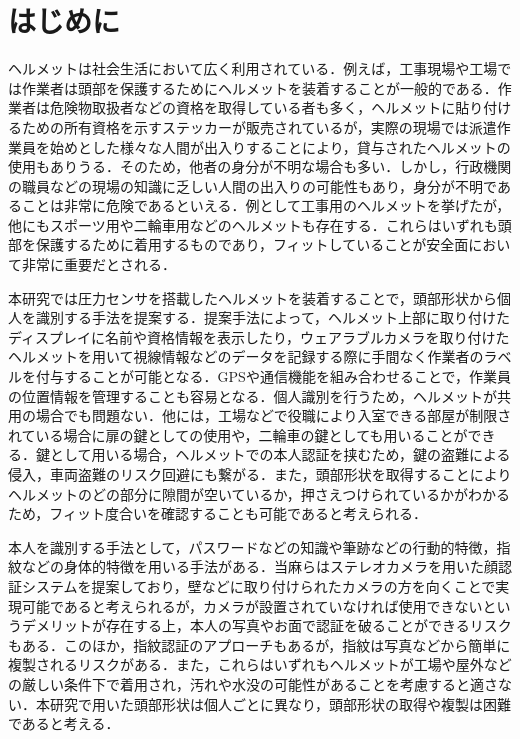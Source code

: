 \documentclass[Japanese,noauthor]{dicomopapers}
\begin{document}
\maketitle

\section{はじめに}
\label{introduction}
ヘルメットは社会生活において広く利用されている．例えば，工事現場や工場では作業者は頭部を保護するためにヘルメットを装着することが一般的である．作業者は危険物取扱者などの資格を取得している者も多く，ヘルメットに貼り付けるための所有資格を示すステッカーが販売されているが，実際の現場では派遣作業員を始めとした様々な人間が出入りすることにより，貸与されたヘルメットの使用もありうる．そのため，他者の身分が不明な場合も多い．しかし，行政機関の職員などの現場の知識に乏しい人間の出入りの可能性もあり，身分が不明であることは非常に危険であるといえる．例として工事用のヘルメットを挙げたが，他にもスポーツ用や二輪車用などのヘルメットも存在する．これらはいずれも頭部を保護するために着用するものであり，フィットしていることが安全面において非常に重要だとされる．\par

本研究では圧力センサを搭載したヘルメットを装着することで，頭部形状から個人を識別する手法を提案する．提案手法によって，ヘルメット上部に取り付けたディスプレイに名前や資格情報を表示したり，ウェアラブルカメラを取り付けたヘルメットを用いて視線情報などのデータを記録する際に手間なく作業者のラベルを付与することが可能となる．GPSや通信機能\cite{disaster}を組み合わせることで，作業員の位置情報を管理することも容易となる．個人識別を行うため，ヘルメットが共用の場合でも問題ない．他には，工場などで役職により入室できる部屋が制限されている場合に扉の鍵としての使用や，二輪車の鍵としても用いることができる．鍵として用いる場合，ヘルメットでの本人認証を挟むため，鍵の盗難による侵入，車両盗難のリスク回避にも繋がる．また，頭部形状を取得することによりヘルメットのどの部分に隙間が空いているか，押さえつけられているかがわかるため，フィット度合いを確認することも可能であると考えられる．\par

本人を識別する手法として，パスワードなどの知識や筆跡などの行動的特徴，指紋などの身体的特徴を用いる手法がある．当麻ら\cite{face}はステレオカメラを用いた顔認証システムを提案しており，壁などに取り付けられたカメラの方を向くことで実現可能であると考えられるが，カメラが設置されていなければ使用できないというデメリットが存在する上，本人の写真やお面で認証を破ることができるリスクもある．このほか，指紋認証のアプローチもあるが，指紋は写真などから簡単に複製されるリスク\cite{finger_print}がある．また，これらはいずれもヘルメットが工場や屋外などの厳しい条件下で着用され，汚れや水没の可能性があることを考慮すると適さない．本研究で用いた頭部形状は個人ごとに異なり，頭部形状の取得や複製は困難であると考える．\par
\end{document}
